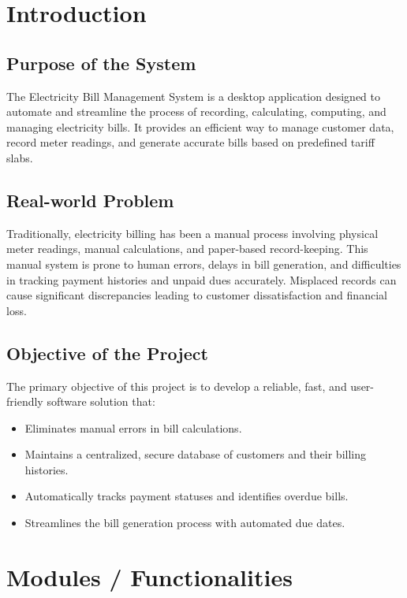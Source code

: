 \documentclass[a4paper,12pt]{article}
\begin{document}
\section{Introduction}

\subsection{Purpose of the System}
The Electricity Bill Management System is a desktop application designed to automate and streamline the process of recording, calculating, computing, and managing electricity bills. It provides an efficient way to manage customer data, record meter readings, and generate accurate bills based on predefined tariff slabs.

\subsection{Real-world Problem}
Traditionally, electricity billing has been a manual process involving physical meter readings, manual calculations, and paper-based record-keeping. This manual system is prone to human errors, delays in bill generation, and difficulties in tracking payment histories and unpaid dues accurately. Misplaced records can cause significant discrepancies leading to customer dissatisfaction and financial loss.

\subsection{Objective of the Project}
The primary objective of this project is to develop a reliable, fast, and user-friendly software solution that:
\begin{itemize}
    \item Eliminates manual errors in bill calculations.
    \item Maintains a centralized, secure database of customers and their billing histories.
    \item Automatically tracks payment statuses and identifies overdue bills.
    \item Streamlines the bill generation process with automated due dates.
\end{itemize}


\section{Modules / Functionalities}
\end{document}
